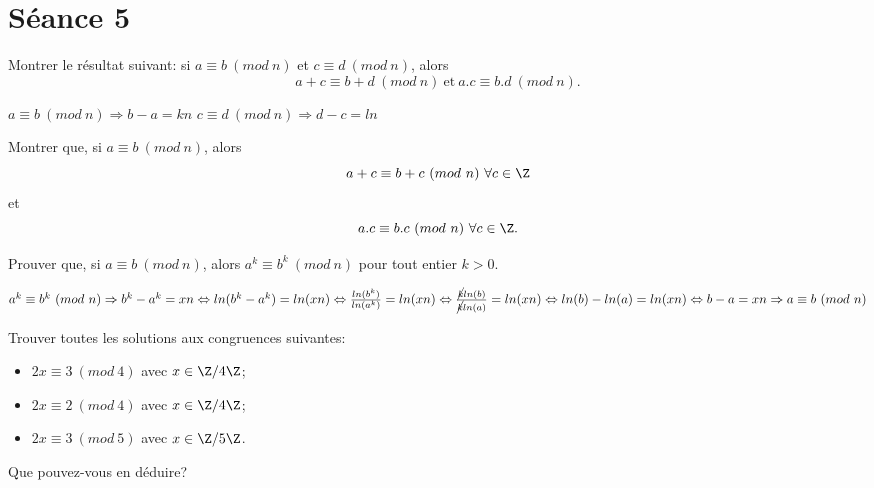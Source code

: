 
\section{Séance 5}

\begin{exo}
Montrer le r\'esultat suivant: si $a\equiv b ~(mod~n)$ et $c\equiv d ~(mod~n)$, alors
$$ a+c \equiv b+d ~(mod~n) ~\mathrm{et}~ a.c \equiv b.d ~(mod~n).$$
\end{exo}

$a\equiv b ~(mod~n) \Rightarrow b - a = kn $ \hspace{1cm} $c\equiv d ~(mod~n) \Rightarrow d - c = ln $ \\


\vspace*{0.8cm}
\begin{exo}
Montrer que, si $a\equiv b ~(mod~n)$, alors $$a+c\equiv b+c ~(mod~n) ~\forall c \in \Z$$ et $$a.c\equiv b.c ~(mod~n) ~\forall c \in \Z.$$ 
\end{exo}


\vspace*{0.8cm}
\begin{exo}
Prouver que, si $a\equiv b ~(mod~n)$, alors $a^k\equiv b^k ~(mod~n)$ pour tout entier $k>0$.
\end{exo}

$a^{k}\equiv b^{k} ~(mod~n) \Rightarrow b^{k} - a^{k} = xn \Leftrightarrow ln(b^{k} - a^{k}) = ln(xn) \Leftrightarrow \frac{ln(b^{k})}{ln(a^k)} = ln(xn) \Leftrightarrow \frac{\cancel{k}ln(b)}{\cancel{k}ln(a)} = ln(xn) \Leftrightarrow ln(b) - ln(a) = ln(xn) \Leftrightarrow b - a = xn \Rightarrow a\equiv b ~(mod~n)$


\vspace*{0.8cm}
\begin{exo}
Trouver toutes les solutions aux congruences suivantes:
\begin{itemize}
\item $2x \equiv 3 ~(mod~4)$ avec $x \in \Z/4\Z$;
\item $2x \equiv 2 ~(mod~4)$ avec $x \in \Z/4\Z$;
\item $2x \equiv 3 ~(mod~5)$ avec $x \in \Z/5\Z$.
\end{itemize}
Que pouvez-vous en d\'eduire?
\end{exo}

